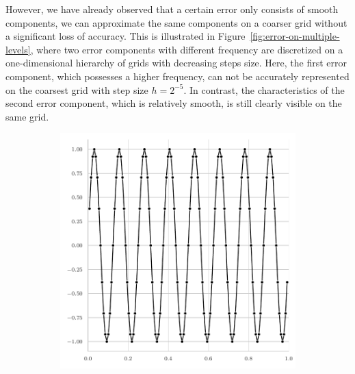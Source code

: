 However, we have already observed that a certain error only consists of smooth components, we can approximate the same components on a coarser grid without a significant loss of accuracy.
This is illustrated in Figure~\ref{fig:error-on-multiple-levels}, where two error components with different frequency are discretized on a one-dimensional hierarchy of grids with decreasing steps size.
Here, the first error component, which possesses a higher frequency, can not be accurately represented on the coarsest grid with step size $h = 2^{-5}$.
In contrast, the characteristics of the second error component, which is relatively smooth, is still clearly visible on the same grid. 
\begin{figure}
	\begin{subfigure}[b]{0.32\textwidth}
		\centering
		\includegraphics[width=\textwidth]{figures/error_plots//initial_error_16pi_level7.pdf}
	\end{subfigure}
	\hfill
	\begin{subfigure}[b]{0.32\textwidth}
		\centering

\end{subfigure}
\end{figure}
